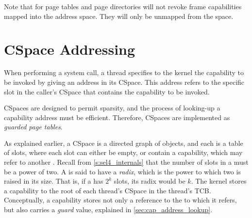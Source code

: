 Note that for page tables and page directories
 will not revoke frame
capabilities mapped into the address space.  They will only be
unmapped from the space.


\section{CSpace Addressing}
\label{s:cspace-addressing}

When performing a system call, a thread specifies to the kernel the
capability to be invoked by giving an address in its CSpace. This
address refers to the specific slot in the caller's CSpace that
contains the capability to be invoked.

CSpaces are designed to permit sparsity, and the process of looking-up
a capability address must be efficient. Therefore, CSpaces are
implemented as \emph{guarded page tables}.

As explained earlier, a CSpace is a directed graph of 
objects, and each  is a table of slots, where each slot can
either be empty, or contain a capability, which may refer to another .
Recall from \autoref{s:sel4_internals} that the number of slots in a 
must be a power of two. A  is said to have a \emph{radix}, which is
the power to which two is raised in its size. That is, if a  has
$2^k$ slots, its radix would be $k$.
The kernel stores a capability to the root  of each thread's
CSpace in the thread's TCB. Conceptually, a  capability
stores not only a reference to the  to which it refers, but
also carries a \emph{guard} value, explained in
\autoref{sec:cap_address_lookup}.

